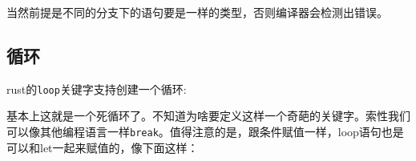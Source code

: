 \documentclass[12pt]{article}
\begin{document}
\begin{Shaded}
\begin{Highlighting}[]
\OperatorTok{=} \OperatorTok{\{}
\OperatorTok{\}}  \OperatorTok{\{}
\OperatorTok{\};}
\end{Highlighting}
\end{Shaded}

当然前提是不同的分支下的语句要是一样的类型，否则编译器会检测出错误。

\subsection{循环}\label{ux5faaux73af}

rust的\texttt{loop}关键字支持创建一个循环:

\begin{Shaded}
\begin{Highlighting}[]
 \OperatorTok{=} \OperatorTok{;}
 \OperatorTok{\{}
\OperatorTok{+=} \OperatorTok{;}
    \NormalTok{(}\OperatorTok{,}\OperatorTok{;}
\OperatorTok{\}}
\end{Highlighting}
\end{Shaded}

基本上这就是一个死循环了。不知道为啥要定义这样一个奇葩的关键字。索性我们可以像其他编程语言一样\texttt{break}。值得注意的是，跟条件赋值一样，loop语句也是可以和let一起来赋值的，像下面这样：

\begin{Shaded}
\begin{Highlighting}[]
\OperatorTok{=}  \OperatorTok{\{}
\OperatorTok{+=} \OperatorTok{;}
    \NormalTok{(}\OperatorTok{,}\OperatorTok{;}
    \OperatorTok{\textgreater{}} \NormalTok{) }\OperatorTok{\{}
        \OperatorTok{;}
    \OperatorTok{\}}
\OperatorTok{\};}
\NormalTok{(}\OperatorTok{,}\OperatorTok{;} 
\end{Highlighting}
\end{Shaded}
\end{document}
